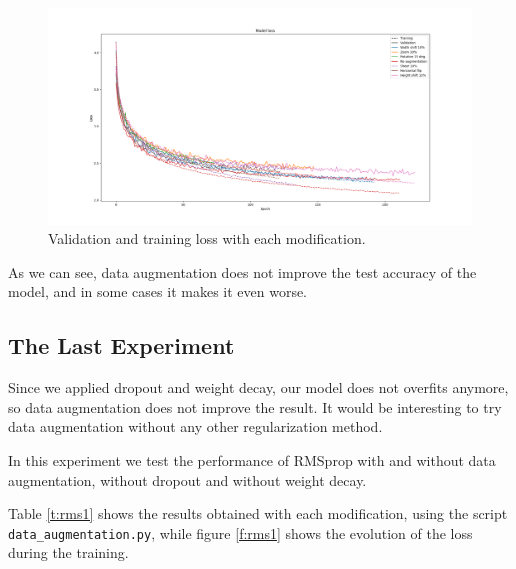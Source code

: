 \documentclass[]{article}
\begin{document}
\begin{figure}[H]
	\centering
	\includegraphics[width=\textwidth]{data_augmentation_loss}
	\caption{Validation and training loss with each modification.}
	\label{f:data1}
\end{figure}

As we can see, data augmentation does not improve the test accuracy of the model, and in some cases it makes it even worse.

\subsection{The Last Experiment}

Since we applied dropout and weight decay, our model does not overfits anymore, so data augmentation does not improve the result. It would be interesting to try data augmentation without any other regularization method.

In this experiment we test the performance of RMSprop with and without data augmentation, without dropout and without weight decay.

Table \ref{t:rms1} shows the results obtained with each modification, using the script \texttt{data\_augmentation.py}, while figure \ref{f:rms1} shows the evolution of the loss during the training.
\end{document}
